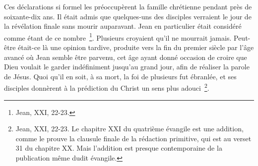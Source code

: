 \documentclass[french,twoside]{book} %
\begin{document}
Ces déclarations si formel les préoccupèrent la famille chrétienne pendant près de soixante-dix ans. Il était admis que quelques-uns des disciples verraient le jour de la révélation finale sans mourir auparavant. Jean en particulier était considéré comme étant de ce nombre \footnote{Jean, XXI, 22-23.}. Plusieurs croyaient qu’il ne mourrait jamais. Peut-être était-ce là une opinion tardive, produite vers la fin du premier siècle par l’âge avancé où Jean semble être parvenu, cet âge ayant donné occasion de croire que Dieu voulait le garder indéfiniment jusqu’au grand jour, afin de réaliser la parole de Jésus. Quoi qu’il en soit, à sa mort, la foi de plusieurs fut ébranlée, et ses disciples donnèrent à la prédiction du Christ un sens plus adouci \footnote{Jean, XXI, 22-23. Le chapitre XXI du quatrième évangile est une addition, comme le prouve la clausule finale de la rédaction primitive, qui est au verset 31 du chapitre XX. Mais l’addition est presque contemporaine de la publication même dudit évangile.}.\par
\end{document}
